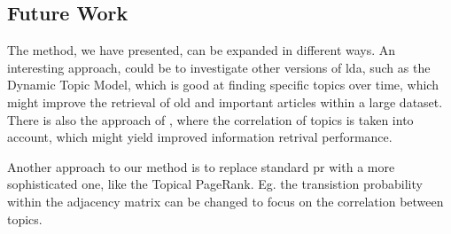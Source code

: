 \subsection{Future Work}\label{sec:future_work}

The method, we have presented, can be expanded in different ways. 
An interesting approach, could be to investigate other versions of \gls{lda}, such as the Dynamic Topic Model\cite{blei2006dynamic}, which is good at finding specific topics over time, which might improve the retrieval of old and important articles within a large dataset.
There is also the approach of \cite{blei2007correlated}, where the correlation of topics is taken into account, which might yield improved information retrival performance.

Another approach to our method is to replace standard \gls{pr} with a more sophisticated one, like the Topical PageRank\cite{yang2009topic}. 
Eg. the transistion probability within the adjacency matrix can be changed to focus on the correlation between topics.

